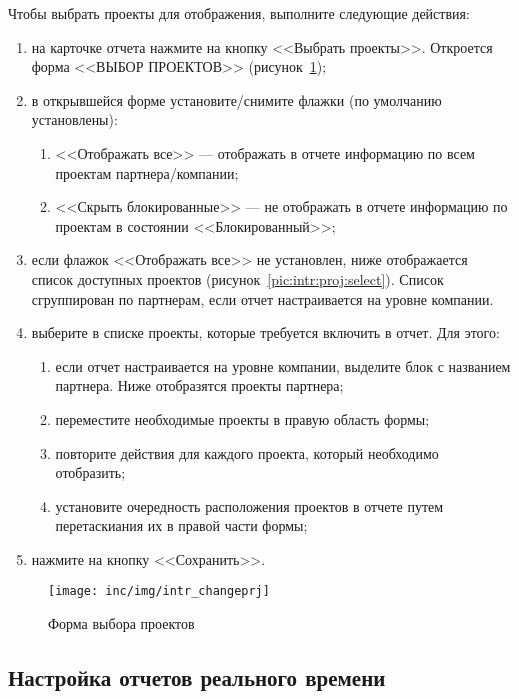 Чтобы выбрать проекты для отображения, выполните следующие действия:
\begin{enumerate}
    \item на карточке отчета нажмите на кнопку <<Выбрать проекты>>. Откроется форма <<ВЫБОР ПРОЕКТОВ>> (рисунок~\ref{pic:changeprj});
    \item в открывшейся форме установите/снимите флажки (по умолчанию установлены):
    \begin{enumerate}
        \item <<Отображать все>> --- отображать в отчете информацию по всем проектам партнера/компании;
        \item <<Скрыть блокированные>> --- не отображать в отчете информацию по проектам в состоянии <<Блокированный>>;
    \end{enumerate}
    \item если флажок <<Отображать все>> не установлен, ниже отображается список доступных проектов (рисунок~\ref{pic:intr:proj:select}). Список сгруппирован по партнерам, если отчет настраивается на уровне компании.
    \item выберите в списке проекты, которые требуется включить в отчет. Для этого:
    \begin{enumerate}
        \item если отчет настраивается на уровне компании, выделите блок с названием партнера. Ниже отобразятся проекты партнера;
        \item переместите необходимые проекты в правую область формы;
        \item повторите действия для каждого проекта, который необходимо отобразить;
        \item установите очередность расположения проектов в отчете путем перетаскиания их в правой части формы;
    \end{enumerate}
    \item нажмите на кнопку <<Сохранить>>.
\end{enumerate}

\begin{figure}[!ht]
    \centering
    \texttt{[image: inc/img/intr\_changeprj]}
    \caption{Форма выбора проектов}
    \label{pic:changeprj}
\end{figure}

\subsection{Настройка отчетов реального времени}\label{subsec:настройка-отчетов-реального-времени}

